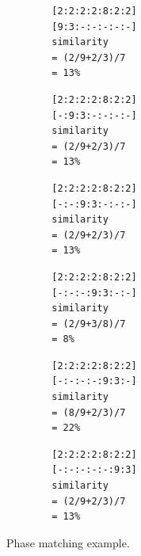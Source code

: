 \documentclass{jhps}
\begin{document}
\def\mpw{0.32}
\begin{listing}
	\noindent\begin{minipage}{\mpw\textwidth}
		\begin{lstlisting}
		[2:2:2:2:8:2:2]
		[9:3:-:-:-:-:-]
		similarity
		= (2/9+2/3)/7
		= 13%
		\end{lstlisting}
		\vspace{-2.5em}
	\end{minipage}
	\hfill
	\noindent\begin{minipage}{\mpw\textwidth}
		\begin{lstlisting}
		[2:2:2:2:8:2:2]
		[-:9:3:-:-:-:-]
		similarity
		= (2/9+2/3)/7
		= 13%
		\end{lstlisting}
		\vspace{-2.5em}
	\end{minipage}
	\hfill
	\noindent\begin{minipage}{\mpw\textwidth}
		\begin{lstlisting}
		[2:2:2:2:8:2:2]
		[-:-:9:3:-:-:-]
		similarity
		= (2/9+2/3)/7
		= 13%
		\end{lstlisting}
		\vspace{-2.5em}
	\end{minipage}

	\noindent\begin{minipage}{\mpw\textwidth}
		\begin{lstlisting}
		[2:2:2:2:8:2:2]
		[-:-:-:9:3:-:-]
		similarity
		= (2/9+3/8)/7
		= 8%
		\end{lstlisting}
		\vspace{-2.5em}
	\end{minipage}
	\hfill
	\noindent\begin{minipage}{\mpw\textwidth}
		\begin{lstlisting}
		[2:2:2:2:8:2:2]
		[-:-:-:-:9:3:-]
		similarity
		= (8/9+2/3)/7
		= 22%
		\end{lstlisting}
		\vspace{-2.5em}
	\end{minipage}
	\hfill
	\noindent\begin{minipage}{\mpw\textwidth}
		\begin{lstlisting}
		[2:2:2:2:8:2:2]
		[-:-:-:-:-:9:3]
		similarity
		= (2/9+2/3)/7
		= 13%
		\end{lstlisting}
		\vspace{-2.5em}
	\end{minipage}
	\caption{Phase matching example.}
	\label{lst:pm_quant:phase_matching_example}
\end{listing}
\end{document}
